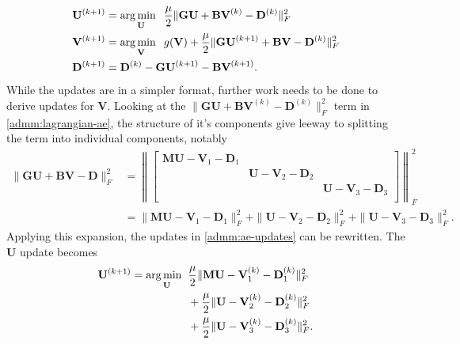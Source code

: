 \begin{equation}
  \label{admm:ae-updates}
  \begin{aligned}
    \mathbf{U}^{(k+1)} &= \operatorname*{arg\,min \;\;}_{\mathbf{U}}  \frac{\mu}{2} \|\mathbf{GU} + \mathbf{BV}^{(k)} - \mathbf{D}^{(k)}\|_F^2 \\
    \mathbf{V}^{(k+1)} &= \operatorname*{arg\,min \;\;}_{\mathbf{V}} g(\mathbf{V}) + \frac{\mu}{2} \|\mathbf{GU}^{(k+1)} + \mathbf{BV} - \mathbf{D}^{(k)}\|_F^2 \\
    \mathbf{D}^{(k+1)} &= \mathbf{D}^{(k)} - \mathbf{GU}^{(k+1)} - \mathbf{BV}^{(k+1)}.
    \end{aligned}
\end{equation}
While the updates are in a simpler format, further work needs to be done to derive updates for $\mathbf{V}$. Looking at the $\|\mathbf{GU} + \mathbf{BV}^{(k)} - \mathbf{D}^{(k)}\|_F^2$ term in \eqref{admm:lagrangian-ae}, the structure of it's components give leeway to splitting the term into individual components, notably
\begin{equation*}
  \begin{aligned}
    \|\mathbf{GU} + \mathbf{BV} - \mathbf{D}\|_F^2 &= 
    \left\lVert
    \begin{bmatrix}
    \mathbf{MU} - \mathbf{V}_1 - \mathbf{D}_1 &  &  \\
      &\mathbf{U} - \mathbf{V}_2 - \mathbf{D}_2&  \\
    &  & \mathbf{U} - \mathbf{V}_3 - \mathbf{D}_3 \\
    \end{bmatrix}
    \right\rVert^2_F \\
    &= \|\mathbf{MU} - \mathbf{V}_1 - \mathbf{D}_1\|_F^2 +
       \|\mathbf{U} - \mathbf{V}_2 - \mathbf{D}_2\|_F^2 +
       \|\mathbf{U} - \mathbf{V}_3 - \mathbf{D}_3\|_F^2.
  \end{aligned}
\end{equation*}
Applying this expansion, the updates in \eqref{admm:ae-updates} can be rewritten. The $\mathbf{U}$ update becomes
\begin{equation}
  \label{admm:ae-updates-u}
  \begin{aligned}
    \mathbf{U}^{(k+1)} = \operatorname*{arg\,min \;\;}_{\mathbf{U}}  & 
    \frac{\mu}{2} \|\mathbf{MU} - \mathbf{V}_1^{(k)} - \mathbf{D}_1^{(k)}\|_F^2 \\
    & + \frac{\mu}{2} \|\mathbf{U} - \mathbf{V}_2^{(k)} - \mathbf{D}_2^{(k)}\|_F^2 \\
    & + \frac{\mu}{2} \|\mathbf{U} - \mathbf{V}_3^{(k)} - \mathbf{D}_3^{(k)}\|_F^2.
  \end{aligned}
\end{equation}
